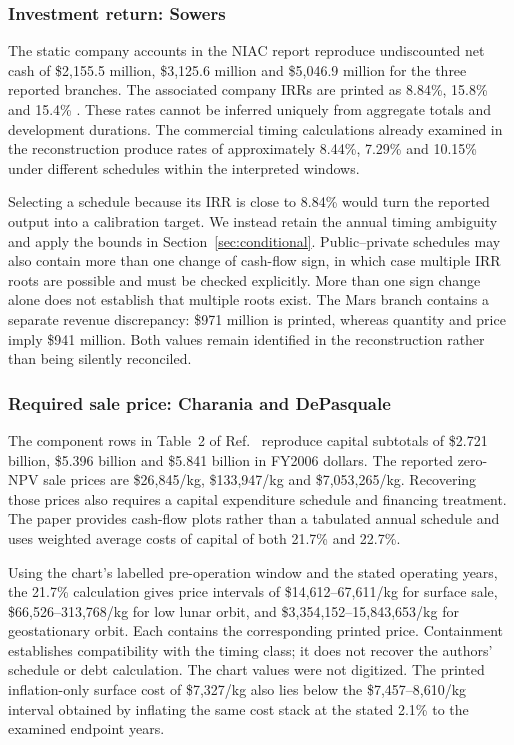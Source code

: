 \documentclass[final,5p,times,twocolumn]{elsarticle}
\begin{document}
\subsubsection{Investment return: Sowers}
The static company accounts in the NIAC report reproduce undiscounted net cash of \$2,155.5 million, \$3,125.6 million and \$5,046.9 million for the three reported branches. The associated company IRRs are printed as 8.84\%, 15.8\% and 15.4\% \cite{sowers2020,sowers2021}. These rates cannot be inferred uniquely from aggregate totals and development durations. The commercial timing calculations already examined in the reconstruction produce rates of approximately 8.44\%, 7.29\% and 10.15\% under different schedules within the interpreted windows.

Selecting a schedule because its IRR is close to 8.84\% would turn the reported output into a calibration target. We instead retain the annual timing ambiguity and apply the bounds in Section~\ref{sec:conditional}. Public--private schedules may also contain more than one change of cash-flow sign, in which case multiple IRR roots are possible and must be checked explicitly. More than one sign change alone does not establish that multiple roots exist. The Mars branch contains a separate revenue discrepancy: \$971 million is printed, whereas quantity and price imply \$941 million. Both values remain identified in the reconstruction rather than being silently reconciled.

\subsubsection{Required sale price: Charania and DePasquale}
The component rows in Table~2 of Ref.~\cite{charania2007} reproduce capital subtotals of \$2.721 billion, \$5.396 billion and \$5.841 billion in FY2006 dollars. The reported zero-NPV sale prices are \$26,845/kg, \$133,947/kg and \$7,053,265/kg. Recovering those prices also requires a capital expenditure schedule and financing treatment. The paper provides cash-flow plots rather than a tabulated annual schedule and uses weighted average costs of capital of both 21.7\% and 22.7\%.

Using the chart's labelled pre-operation window and the stated operating years, the 21.7\% calculation gives price intervals of \$14,612--67,611/kg for surface sale, \$66,526--313,768/kg for low lunar orbit, and \$3,354,152--15,843,653/kg for geostationary orbit. Each contains the corresponding printed price. Containment establishes compatibility with the timing class; it does not recover the authors' schedule or debt calculation. The chart values were not digitized. The printed inflation-only surface cost of \$7,327/kg also lies below the \$7,457--8,610/kg interval obtained by inflating the same cost stack at the stated 2.1\% to the examined endpoint years.
\end{document}
